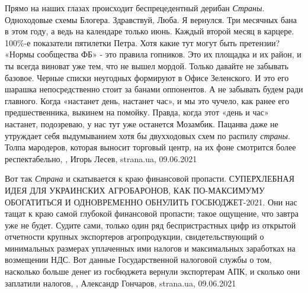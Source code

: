 Прямо на наших глазах происходит беспрецедентный дерибан \emph{Страны}.  Одноходовые
схемы Блогера. Здравствуй, Люба. Я вернулся. Три месячных бана в этом году, а
ведь на календаре только июнь. Каждый второй месяц в карцере. 100\%-е
показатели пятилетки Петра.  Хотя какие тут могут быть претензии? «Нормы
сообщества ФБ» - это правила гопников. Это их площадка и их район, и ты всегда
виноват уже тем, что не вышел мордой.  Только давайте не забывать базовое.
Черные списки неугодных формируют в Офисе Зеленского. И это его шарашка
непосредственно стоит за банами оппонентов. А не забывать будем ради главного.
Когда «настанет день, настанет час», и мы это чучело, как ранее его
предшественника, выкинем на помойку.  Правда, когда этот «день и час»
настанет, подозреваю, у нас тут уже останется Мозамбик.  Пацанва даже не
утруждает себя выдумыванием хотя бы двухходовых схем по распилу \emph{страны}. Толпа
мародеров, которая выносит торговый центр, на их фоне смотрится более
респектабельно,
, Игорь Лесев, strana.ua, 09.06.2021

Вот так \emph{Страна} и скатывается к краю финансовой пропасти. СУПЕРХЛЕБНАЯ
ИДЕЯ ДЛЯ УКРАИНСКИХ АГРОБАРОНОВ, КАК ПО-МАКСИМУМУ ОБОГАТИТЬСЯ И ОДНОВРЕМЕННО
ОБНУЛИТЬ ГОСБЮДЖЕТ-2021. Они нас тащат к краю самой глубокой финансовой
пропасти; такое ощущение, что завтра уже не будет. Судите сами, только один ряд
беспристрастных цифр из открытой отчетности крупных экспортеров агропродукции,
свидетельствующий о минимальных размерах уплаченных ими налогов и максимальных
заработках на возмещении НДС. Вот данные Государственной налоговой службы о
том, насколько больше денег из госбюджета вернули экспортерам АПК, и сколько
они заплатили налогов,
, Александр Гончаров, strana.ua, 09.06.2021

